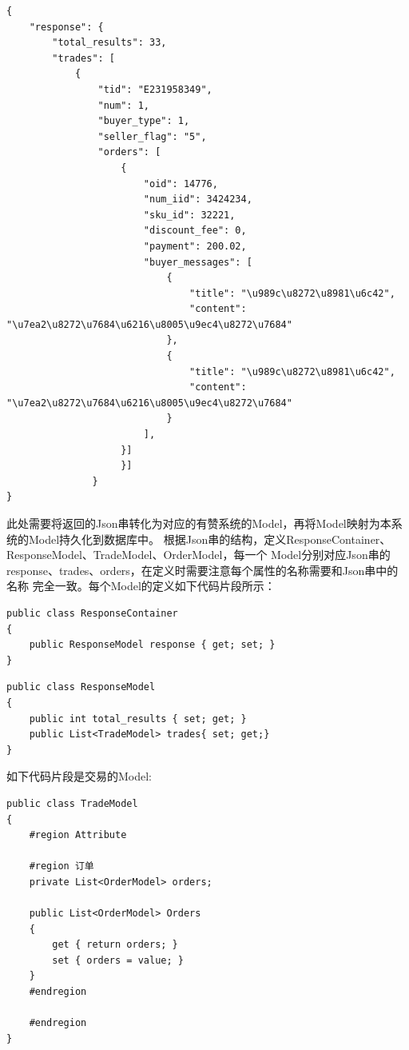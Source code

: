 \documentclass{book}
\begin{document}
\begin{lstlisting}
{
    "response": {
        "total_results": 33,
        "trades": [
            {
                "tid": "E231958349",
                "num": 1,                
                "buyer_type": 1,  
                "seller_flag": "5", 
                "orders": [
                    {
                        "oid": 14776,
                        "num_iid": 3424234,
                        "sku_id": 32221, 
                        "discount_fee": 0,
                        "payment": 200.02,
                        "buyer_messages": [
                            {
                                "title": "\u989c\u8272\u8981\u6c42",
                                "content": "\u7ea2\u8272\u7684\u6216\u8005\u9ec4\u8272\u7684"
                            },
                            {
                                "title": "\u989c\u8272\u8981\u6c42",
                                "content": "\u7ea2\u8272\u7684\u6216\u8005\u9ec4\u8272\u7684"
                            }
                        ],                       
                    }]
                    }]
               }
}
\end{lstlisting}

此处需要将返回的Json串转化为对应的有赞系统的Model，再将Model映射为本系统的Model持久化到数据库中。
根据Json串的结构，定义ResponseContainer、ResponseModel、TradeModel、OrderModel，每一个
Model分别对应Json串的response、trades、orders，在定义时需要注意每个属性的名称需要和Json串中的名称
完全一致。每个Model的定义如下代码片段所示：

\begin{lstlisting}[language={[Sharp]C}]
public class ResponseContainer
{
    public ResponseModel response { get; set; }        
}
\end{lstlisting}

\begin{lstlisting}[language={[Sharp]C}]
public class ResponseModel
{
    public int total_results { set; get; }
    public List<TradeModel> trades{ set; get;}        
}
\end{lstlisting}

如下代码片段是交易的Model:

\begin{lstlisting}[language={[Sharp]C}]
public class TradeModel
{
    #region Attribute 
    
    #region 订单
    private List<OrderModel> orders;

    public List<OrderModel> Orders
    {
        get { return orders; }
        set { orders = value; }
    }
    #endregion

    #endregion
}
\end{lstlisting}
\end{document}
